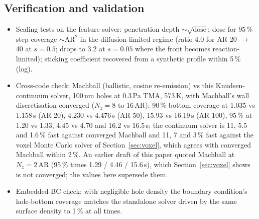 \documentclass[11pt,letterpaper]{article}
\begin{document}
\subsection{Verification and validation}
\label{sec:vv}
\begin{itemize}
\item Scaling tests on the feature solver: penetration depth $\sim \sqrt{\text{dose}}$; dose for 95\,\% step coverage $\sim \mathrm{AR}^2$ in the diffusion-limited regime (ratio 4.0 for AR 20 $\to$ 40 at $s = 0.5$; drops to 3.2 at $s = 0.05$ where the front becomes reaction-limited); sticking coefficient recovered from a synthetic profile within 5\,\% (log).
\item Cross-code check: Machball \cite{machball} (ballistic, cosine re-emission) vs this Knudsen-continuum solver, 100\,nm holes at 0.3\,Pa TMA, 573\,K, with Machball's wall discretisation converged ($N_z = 8$ to 16\,AR): 90\,\% bottom coverage at 1.035 vs 1.158\,s (AR 20), 4.230 vs 4.476\,s (AR 50), 15.93 vs 16.19\,s (AR 100), 95\,\% at 1.20 vs 1.33, 4.45 vs 4.70 and 16.2 vs 16.5\,s; the continuum solver is 11, 5.5 and 1.6\,\% fast against converged Machball and 11, 7 and 3\,\% fast against the voxel Monte Carlo solver of Section~\ref{sec:voxel}, which agrees with converged Machball within 2\,\%. An earlier draft of this paper quoted Machball at $N_z = 2$\,AR (95\,\% times 1.29 / 4.46 / 15.6\,s), which Section~\ref{sec:voxel} shows is not converged; the values here supersede them.
\item Embedded-BC check: with negligible hole density the boundary condition's hole-bottom coverage matches the standalone solver driven by the same surface density to 1\,\% at all times.

\end{itemize}
\end{document}
